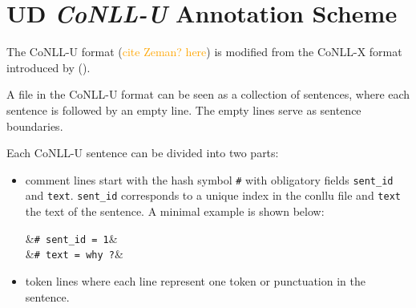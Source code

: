 



\newcommand{\conllu}[1]{&\footnotesize\texttt{#1}}
\newcommand{\tab}{&\hspace{0.1em}}
\setlength{\abovedisplayskip}{3pt}
\setlength{\belowdisplayskip}{3pt}

\section{UD \emph{CoNLL-U} Annotation Scheme}

The CoNLL-U format (\textcolor{orange}{cite Zeman? here}) is modified from the CoNLL-X format introduced by (\cite{buchholz-marsi-2006-conll}).

A file in the CoNLL-U format can be seen as a collection of sentences, where each sentence is followed by an empty line. The empty lines serve as sentence boundaries.

Each CoNLL-U sentence can be divided into two parts:
\begin{itemize}
	\item comment lines  start with the hash symbol \texttt{\#} with obligatory fields \texttt{sent\_id} and \texttt{text}. \texttt{sent\_id} corresponds to a unique index in the conllu file and \texttt{text} the text of the sentence. A minimal example is shown below:
	\begin{flalign*}
	\conllu{\# sent\_id = 1}&\\
	\conllu{\# text = why ?}&
	\end{flalign*}
	\item token lines where each line represent one token or punctuation in the sentence.
\end{itemize}
